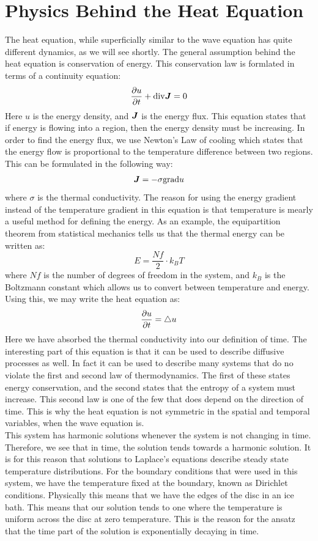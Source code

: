 \documentclass{paper}
\begin{document}
\section{Physics Behind the Heat Equation}
The heat equation, while superficially similar to the wave equation has quite different dynamics, as we will see shortly. The general assumption behind the heat equation is conservation of energy. This conservation law is formlated in terms of a continuity equation:
\begin{equation}\frac{\partial u}{\partial t}+\mathrm{div} \bm{J}=0\end{equation}
Here $u$ is the energy density, and $\bm{J}$ is the energy flux. This equation states that if energy is flowing into a region, then the energy density must be increasing. In order to find the energy flux, we use Newton's Law of cooling which states that the energy flow is proportional to the temperature difference between two regions. This can be formulated in the following way:
\begin{equation}\bm{J}=-\sigma\mathrm{grad} u\end{equation}
where $\sigma$ is the thermal conductivity. The reason for using the energy gradient instead of the temperature gradient in this equation is that temperature is mearly a useful method for defining the energy. As an example, the equipartition theorem from statistical mechanics tells us that the thermal energy can be written as:
\begin{equation}E=\frac{N f}{2} \cdot k_B T\end{equation}
where $N f$ is the number of degrees of freedom in the system, and $k_B$ is the Boltzmann constant which allows us to convert between temperature and energy. Using this, we may write the heat equation as:
\begin{equation}\frac{\partial u}{\partial t}=\bigtriangleup u\end{equation}
Here we have absorbed the thermal conductivity into our definition of time. The interesting part of this equation is that it can be used to describe diffusive processes as well. In fact it can be used to describe many systems that do no violate the first and second law of thermodynamics. The first of these states energy conservation, and the second states that the entropy of a system must increase. This second law is one of the few that does depend on the direction of time. This is why the heat equation is not symmetric in the spatial and temporal variables, when the wave equation is.\\
This system has harmonic solutions whenever the system is not changing in time. Therefore, we see that in time, the solution tends towards a harmonic solution. It is for this reason that solutions to Laplace's equations describe steady state temperature distributions. For the boundary conditions that were used in this system, we have the temperature fixed at the boundary, known as Dirichlet conditions. Physically this means that we have the edges of the disc in an ice bath. This means that our solution tends to one where the temperature is uniform across the disc at zero temperature. This is the reason for the ansatz that the time part of the solution is exponentially decaying in time.
\end{document}
